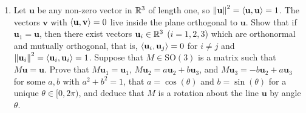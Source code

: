 \documentclass[../psets.tex]{subfiles}
\begin{document}
\begin{enumerate}
\begin{enumerate}
\begin{enumerate}
\begin{proof}
\begin{align*}
                \end{align*}
                that suitable eigenvectors are
                \begin{align*}
                    \mathbf{x} &=
                    \begin{pmatrix}
                        a\\
                        b+1\\
                    \end{pmatrix}&
                    \mathbf{y} &=
                    \begin{pmatrix}
                        a\\
                        b-1\\
                    \end{pmatrix}
                \end{align*}
                Indeed, we have by direct computation that
                \begin{equation*}
                    \inp{\mathbf{x}}{\mathbf{y}} = a^2+(b+1)(b-1)
                    = a^2+b^2-1
                    = 1-1
                    = 0
                \end{equation*}
                as desired.
            \end{proof}
            \item If $M,N\in\text{O}(2)\setminus\text{SO}(2)$, then $MN\in\text{SO}(2)$ is a rotation.
            \begin{proof}
                Since $\text{O}(2)$ is a group (and hence closed) by part (a), $MN\in\text{O}(2)$. Additionally,
                \begin{equation*}
                    \det(MN) = \det(M)\det(N)
                    = (-1)(-1)
                    = 1
                \end{equation*}
                so $MN\in\text{SO}(2)$ by part (b). Lastly, since every element of $\text{SO}(2)$ is a rotation by part (c), $MN$ is a rotation, as desired.
            \end{proof}
        \end{enumerate}
        \item Let $\mathbf{u}$ be any non-zero vector in $\mathbb{R}^3$ of length one, so $\norm{\mathbf{u}}^2=\left\langle{\mathbf{u}},{\mathbf{u}}\right\rangle=1$. The vectors $\mathbf{v}$ with $\left\langle{\mathbf{u}},{\mathbf{v}}\right\rangle=0$ live inside the plane orthogonal to $\mathbf{u}$. Show that if $\mathbf{u}_1=\mathbf{u}$, then there exist vectors $\mathbf{u}_i\in\mathbb{R}^3$ ($i=1,2,3$) which are orthonormal and mutually orthogonal, that is, $\left\langle{\mathbf{u}_i},{\mathbf{u}_j}\right\rangle=0$ for $i\neq j$ and $\norm{\mathbf{u}_i}^2=\left\langle{\mathbf{u}_i},{\mathbf{u}_i}\right\rangle=1$. Suppose that $M\in\text{SO}(3)$ is a matrix such that $M\mathbf{u}=\mathbf{u}$. Prove that $M\mathbf{u}_1=\mathbf{u}_1$, $M\mathbf{u}_2=a\mathbf{u}_2+b\mathbf{u}_3$, and $M\mathbf{u}_3=-b\mathbf{u}_2+a\mathbf{u}_3$ for some $a,b$ with $a^2+b^2=1$, that $a=\cos(\theta)$ and $b=\sin(\theta)$ for a unique $\theta\in[0,2\pi)$, and deduce that $M$ is a rotation about the line $\mathbf{u}$ by angle $\theta$.

\end{enumerate}
\end{enumerate}
\end{document}
